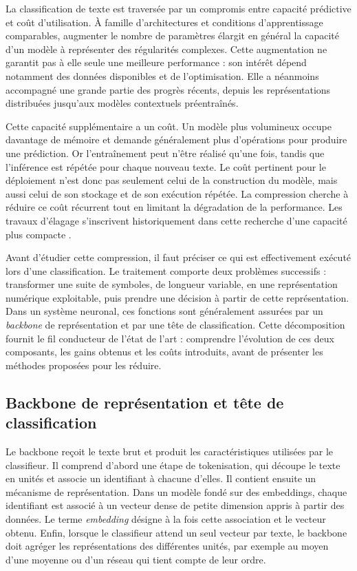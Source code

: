 
La classification de texte est traversée par un compromis entre capacité
prédictive et coût d'utilisation. À famille d'architectures et conditions
d'apprentissage comparables, augmenter le nombre de paramètres élargit en
général la capacité d'un modèle à représenter des régularités complexes. Cette
augmentation ne garantit pas à elle seule une meilleure performance : son
intérêt dépend notamment des données disponibles et de l'optimisation. Elle a
néanmoins accompagné une grande partie des progrès récents, depuis les
représentations distribuées jusqu'aux modèles contextuels préentraînés.

Cette capacité supplémentaire a un coût. Un modèle plus volumineux occupe
davantage de mémoire et demande généralement plus d'opérations pour produire
une prédiction. Or l'entraînement peut n'être réalisé qu'une fois, tandis que
l'inférence est répétée pour chaque nouveau texte. Le coût pertinent pour le
déploiement n'est donc pas seulement celui de la construction du modèle, mais
aussi celui de son stockage et de son exécution répétée. La compression cherche
à réduire ce coût récurrent tout en limitant la dégradation de la performance.
Les travaux d'élagage s'inscrivent historiquement dans cette recherche d'une
capacité plus compacte \cite{lecun1989obd,han2015learning}.

Avant d'étudier cette compression, il faut préciser ce qui est effectivement
exécuté lors d'une classification. Le traitement comporte deux problèmes
successifs : transformer une suite de symboles, de longueur variable, en une
représentation numérique exploitable, puis prendre une décision à partir de
cette représentation. Dans un système neuronal, ces fonctions sont
généralement assurées par un \emph{backbone} de représentation et par une tête
de classification. Cette décomposition fournit le fil conducteur de l'état de
l'art : comprendre l'évolution de ces deux composants, les gains obtenus et les
coûts introduits, avant de présenter les méthodes proposées pour les réduire.

\subsection{Backbone de représentation et tête de classification}
\label{ssec:etat_art_architecture}

Le backbone reçoit le texte brut et produit les caractéristiques utilisées par
le classifieur. Il comprend d'abord une étape de tokenisation, qui découpe le
texte en unités et associe un identifiant à chacune d'elles. Il contient ensuite
un mécanisme de représentation. Dans un modèle fondé sur des embeddings, chaque
identifiant est associé à un vecteur dense de petite dimension appris à partir
des données. Le terme \emph{embedding} désigne à la fois cette association et
le vecteur obtenu. Enfin, lorsque le classifieur attend un seul vecteur par
texte, le backbone doit agréger les représentations des différentes unités, par
exemple au moyen d'une moyenne ou d'un réseau qui tient compte de leur ordre.

